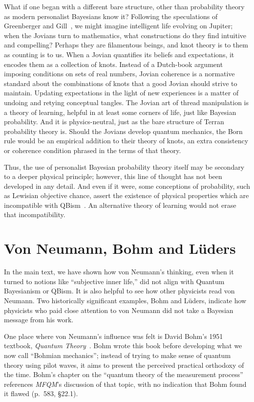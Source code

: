 \documentclass[aps,pra,superscriptaddress,12pt,tightenlines,nofootinbib]{revtex4}
\newcommand{\booktitle}{\textsl}
\newcommand{\MFQM}{\textsl{MFQM}}
\begin{document}
What if one began with a different bare structure, other than
probability theory as modern personalist Bayesians know it?  Following
the speculations of Greenberger and Gill~\cite[pp.\ 567,
  1265]{Fuchs2014}, we might imagine intelligent life evolving on
Jupiter; when the Jovians turn to mathematics, what constructions do
they find intuitive and compelling?  Perhaps they are filamentous
beings, and knot theory is to them as counting is to us.  When a
Jovian quantifies its beliefs and expectations, it encodes them as a
collection of knots.  Instead of a Dutch-book argument imposing
conditions on sets of real numbers, Jovian coherence is a normative
standard about the combinations of knots that a good Jovian should
strive to maintain.  Updating expectations in the light of new
experiences is a matter of undoing and retying conceptual tangles.
The Jovian art of thread manipulation is a theory of learning, helpful
in at least some corners of life, just like Bayesian probability.  And
it is physics-neutral, just as the bare structure of Terran
probability theory is.  Should the Jovians develop quantum mechanics,
the Born rule would be an empirical addition to their theory of knots,
an extra consistency or coherence condition phrased in the terms of
that theory.

Thus, the use of personalist Bayesian probability theory itself may be
secondary to a deeper physical principle; however, this line of
thought has not been developed in any detail.  And even if it were,
some conceptions of probability, such as Lewisian objective chance,
assert the existence of physical properties which are incompatible
with QBism~\cite{RMP}.  An alternative theory of learning would not
erase that incompatibility.

\section{Von Neumann, Bohm and L\"uders}

In the main text, we have shown how von Neumann's thinking, even when
it turned to notions like ``subjective inner life,'' did not align
with Quantum Bayesianism or QBism.  It is also helpful to see how
other physicists read von Neumann.  Two historically significant
examples, Bohm and L\"uders, indicate how physicists who paid close
attention to von Neumann did not take a Bayesian message from his
work.

One place where von Neumann's influence was felt is David Bohm's 1951
textbook, \booktitle{Quantum Theory}~\cite{Bohm1951}.  Bohm wrote this
book before developing what we now call ``Bohmian mechanics''; instead
of trying to make sense of quantum theory using pilot waves, it aims
to present the perceived practical orthodoxy of the time.  Bohm's
chapter on the ``quantum theory of the measurement process''
references \MFQM's discussion of that topic, with no indication that
Bohm found it flawed (p.\ 583, \S 22.1).
\end{document}
